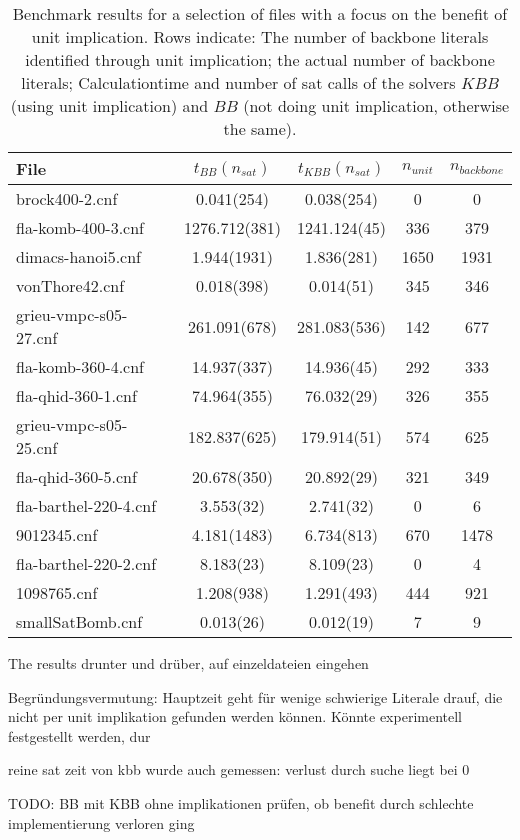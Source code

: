 \begin{table}[h!] %
\label{tab:bbkbb} %
\begin{tabular}{l| c c c c }
File & $t_{BB}(n_{sat})$ & $t_{KBB}(n_{sat})$ & $n_{unit}$ & $n_{backbone}$  \\
\hline
brock400-2.cnf & 0.041(254) & 0.038(254) & 0 & 0 \\
fla-komb-400-3.cnf & 1276.712(381) & 1241.124(45) & 336 & 379 \\
dimacs-hanoi5.cnf & 1.944(1931) & 1.836(281) & 1650 & 1931 \\
vonThore42.cnf & 0.018(398) & 0.014(51) & 345 & 346 \\
grieu-vmpc-s05-27.cnf & 261.091(678) & 281.083(536) & 142 & 677 \\
fla-komb-360-4.cnf & 14.937(337) & 14.936(45) & 292 & 333 \\
fla-qhid-360-1.cnf & 74.964(355) & 76.032(29) & 326 & 355 \\
grieu-vmpc-s05-25.cnf & 182.837(625) & 179.914(51) & 574 & 625 \\
fla-qhid-360-5.cnf & 20.678(350) & 20.892(29) & 321 & 349 \\
fla-barthel-220-4.cnf & 3.553(32) & 2.741(32) & 0 & 6 \\
9012345.cnf & 4.181(1483) & 6.734(813) & 670 & 1478 \\
fla-barthel-220-2.cnf & 8.183(23) & 8.109(23) & 0 & 4 \\
1098765.cnf & 1.208(938) & 1.291(493) & 444 & 921 \\
smallSatBomb.cnf & 0.013(26) & 0.012(19) & 7 & 9 \\
\end{tabular}
\caption{Benchmark results for a selection of files with a focus on the benefit of unit implication.
Rows indicate: The number of backbone literals identified through unit implication; the actual number of backbone literals; Calculationtime and number of sat calls of the solvers $KBB$ (using unit implication) and $BB$ (not doing unit implication, otherwise the same).}
\end{table}



The results drunter und drüber, auf einzeldateien eingehen

Begründungsvermutung: Hauptzeit geht für wenige schwierige Literale drauf, die nicht per unit implikation gefunden werden können. Könnte experimentell festgestellt werden, dur



reine sat zeit von kbb wurde auch gemessen: verlust durch suche liegt bei 0

TODO: BB mit KBB ohne implikationen prüfen, ob benefit durch schlechte implementierung verloren ging
